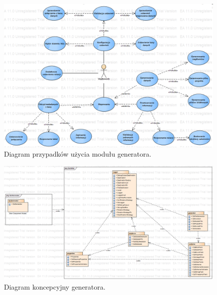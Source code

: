 \documentclass[12pt]{report}
\begin{document}
\begin{figure}[!ht]
	\centering
	\includegraphics[width=1.4\textwidth, angle=90]{images/QubicUseCase.png}
	\caption{Diagram przypadków użycia modułu generatora.}
\end{figure}
\FloatBarrier

\begin{figure}[h]
	\centering
	\includegraphics[width=1.4\textwidth, angle=90]{images/Qubic.png}
	\caption{Diagram koncepcyjny generatora.}
\end{figure}
\FloatBarrier
\end{document}

